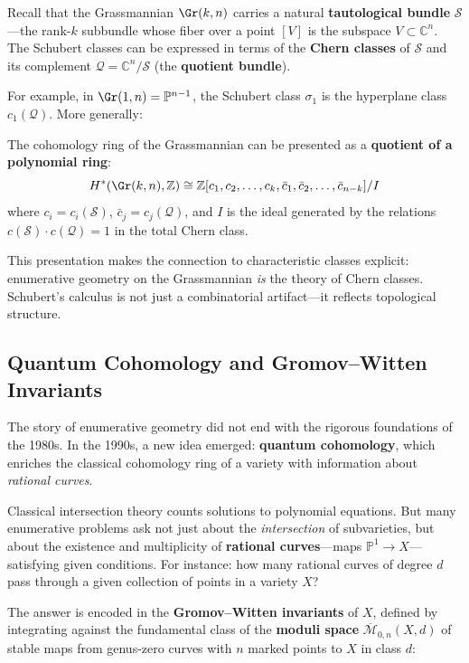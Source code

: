 Recall that the Grassmannian $\Gr(k, n)$ carries a natural \textbf{tautological bundle} $\mathcal{S}$---the rank-$k$ subbundle whose fiber over a point $[V]$ is the subspace $V \subset \mathbb{C}^n$. The Schubert classes can be expressed in terms of the \textbf{Chern classes} of $\mathcal{S}$ and its complement $\mathcal{Q} = \mathbb{C}^n / \mathcal{S}$ (the \textbf{quotient bundle}).

For example, in $\Gr(1, n) = \mathbb{P}^{n-1}$, the Schubert class $\sigma_1$ is the hyperplane class $c_1(\mathcal{Q})$. More generally:

\begin{theorem}\label{thm:grassmannian-quotient}
The cohomology ring of the Grassmannian can be presented as a \textbf{quotient of a polynomial ring}:
\[
    H^*(\Gr(k,n), \mathbb{Z}) \cong \mathbb{Z}[c_1, c_2, \ldots, c_k, \bar{c}_1, \bar{c}_2, \ldots, \bar{c}_{n-k}] / I
\]
where $c_i = c_i(\mathcal{S})$, $\bar{c}_j = c_j(\mathcal{Q})$, and $I$ is the ideal generated by the relations $c(\mathcal{S}) \cdot c(\mathcal{Q}) = 1$ in the total Chern class.
\end{theorem}

This presentation makes the connection to characteristic classes explicit: enumerative geometry on the Grassmannian \emph{is} the theory of Chern classes. Schubert's calculus is not just a combinatorial artifact---it reflects topological structure.

\subsection{Quantum Cohomology and Gromov--Witten Invariants}

The story of enumerative geometry did not end with the rigorous foundations of the 1980s. In the 1990s, a new idea emerged: \textbf{quantum cohomology}, which enriches the classical cohomology ring of a variety with information about \emph{rational curves}.

Classical intersection theory counts solutions to polynomial equations. But many enumerative problems ask not just about the \emph{intersection} of subvarieties, but about the existence and multiplicity of \textbf{rational curves}---maps $\mathbb{P}^1 \to X$---satisfying given conditions. For instance: how many rational curves of degree $d$ pass through a given collection of points in a variety $X$?

The answer is encoded in the \textbf{Gromov--Witten invariants} of $X$, defined by integrating against the fundamental class of the \textbf{moduli space} $\overline{\mathcal{M}}_{0,n}(X, d)$ of stable maps from genus-zero curves with $n$ marked points to $X$ in class $d$:


